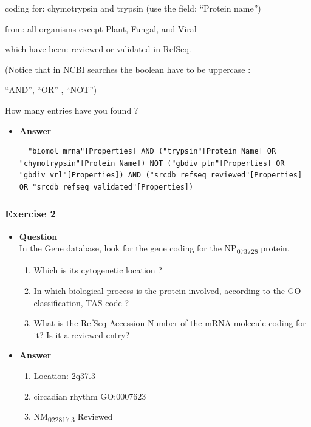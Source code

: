 \documentclass[11pt]{article}
\begin{document}
coding for:                   chymotrypsin and trypsin  (use the field: ``Protein name'')

from:                             all organisms except Plant, Fungal, and Viral

which have been:         reviewed or validated in RefSeq.

(Notice that in NCBI searches the boolean have to be uppercase :

``AND'', ``OR'' , ``NOT'')




How many entries have you found ?


\begin{itemize}
\item \textbf{Answer}\\

\begin{verbatim}
  "biomol mrna"[Properties] AND ("trypsin"[Protein Name] OR "chymotrypsin"[Protein Name]) NOT ("gbdiv pln"[Properties] OR "gbdiv vrl"[Properties]) AND ("srcdb refseq reviewed"[Properties] OR "srcdb refseq validated"[Properties])
\end{verbatim}
\end{itemize}

\subsubsection{Exercise 2}
\label{sec:orgd3331c6}
\begin{itemize}
\item \textbf{Question}\\
In the Gene database, look for the gene coding for the NP\textsubscript{073728} protein.

\begin{enumerate}
\item Which is its cytogenetic location ?

\item In which biological process is the protein involved, according to the GO classification, TAS code ?

\item What is the RefSeq Accession Number of the mRNA molecule coding for it?  Is it a reviewed entry?
\end{enumerate}
\end{itemize}


\begin{itemize}
\item \textbf{Answer}\\

\begin{enumerate}
\item Location: 2q37.3
\item circadian rhythm       GO:0007623
\item NM\textsubscript{022817.3} Reviewed
\end{enumerate}
\end{itemize}
\end{document}
